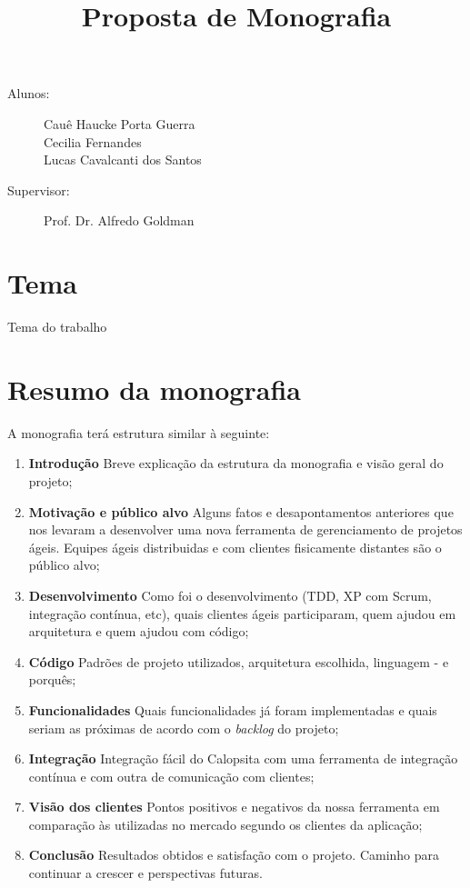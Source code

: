 \documentclass[titlepage]{article}
\title{Proposta de Monografia}
\author{}
\begin{document}
\maketitle

\begin{description} 
\item[Alunos:]Cauê Haucke Porta Guerra\\Cecilia Fernandes\\Lucas Cavalcanti dos Santos
\item[Supervisor: ] Prof. Dr. Alfredo Goldman
\end{description}

\section{Tema}
Tema do trabalho

\section{Resumo da monografia}
A monografia terá estrutura similar à seguinte:

\begin{enumerate}
	\item{\textbf{Introdução} Breve explicação da estrutura da monografia e visão geral do projeto;}
	\item{\textbf{Motivação e público alvo} Alguns fatos e desapontamentos anteriores que nos levaram a desenvolver uma nova ferramenta de gerenciamento de projetos ágeis. Equipes ágeis distribuidas e com clientes fisicamente distantes são o público alvo;}
	\item{\textbf{Desenvolvimento} Como foi o desenvolvimento (TDD, XP com Scrum, integração contínua, etc), quais clientes ágeis participaram, quem ajudou em arquitetura e quem ajudou com código;}
	\item{\textbf{Código} Padrões de projeto utilizados, arquitetura escolhida, linguagem - e porquês;}
	\item{\textbf{Funcionalidades} Quais funcionalidades já foram implementadas e quais seriam as próximas de acordo com o \textit{backlog} do projeto;}
	\item{\textbf{Integração} Integração fácil do Calopsita com uma ferramenta de integração contínua e com outra de comunicação com clientes;}
	\item{\textbf{Visão dos clientes} Pontos positivos e negativos da nossa ferramenta em comparação às utilizadas no mercado segundo os clientes da aplicação;}
	\item{\textbf{Conclusão} Resultados obtidos e satisfação com o projeto. Caminho para continuar a crescer e perspectivas futuras.}
\end{enumerate}
\end{document}
